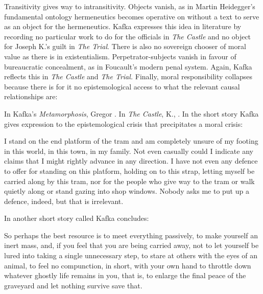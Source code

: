 \documentclass[11pt]{article}
\begin{document}
Transitivity gives way to intransitivity. Objects vanish, as in Martin
Heidegger's fundamental ontology hermeneutics becomes operative on
 without a text to serve as an object for the
hermeneutics. Kafka expresses this idea in literature by recording no
particular work to do for the officials in \emph{The Castle} and no
object for Joseph K.'s guilt in \emph{The Trial}. There is also no
sovereign chooser of moral value as there is in existentialism.
Perpetrator-subjects vanish in favour of bureaucratic concealment, as
in Foucault's modern penal system. Again, Kafka reflects this in
\emph{The Castle} and \emph{The Trial.} Finally, moral responsibility
collapses because there is for it no epistemological access to what
the relevant causal relationships are: 

In Kafka's \emph{Metamorphosis}, Gregor  . In
\emph{The Castle}, K.,  . In the short story  Kafka gives expression to the epistemological crisis that
precipitates a moral crisis:

\begin{quotex}
  I stand on the end platform of the tram and am completely unsure of
  my footing in this world, in this town, in my family. Not even
  casually could I indicate any claims that I might rightly advance in
  any direction. I have not even any defence to offer for standing on
  this platform, holding on to this strap, letting myself be carried
  along by this tram, nor for the people who give way to the tram or
  walk quietly along or stand gazing into shop windows. Nobody asks me
  to put up a defence, indeed, but that is irrelevant.
\end{quotex}

In another short story called  Kafka concludes:

\begin{quotex}
  So perhaps the best resource is to meet everything passively, to
  make yourself an inert mass, and, if you feel that you are being
  carried away, not to let yourself be lured into taking a single
  unnecessary step, to stare at others with the eyes of an animal, to
  feel no compunction, in short, with your own hand to throttle down
  whatever ghostly life remains in you, that is, to enlarge the final
  peace of the graveyard and let nothing survive save that.
\end{quotex}
\end{document}
